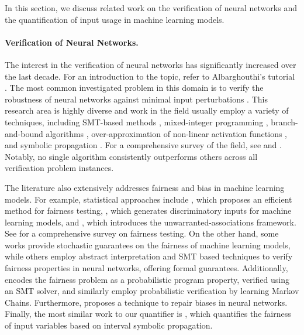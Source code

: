 In this section, we discuss related work on the verification of neural networks and the quantification of input usage in machine learning models.

\paragraph{Verification of Neural Networks.}

The interest in the verification of neural networks has significantly increased over the last decade. For an introduction to the topic, refer to Albarghouthi's tutorial \cite{Albarghouthi2021}.
The most common investigated problem in this domain is to verify the robustness of neural networks against minimal input perturbations .
This research area is highly diverse and work in the field usually employ a variety of techniques, including SMT-based methods , mixed-integer programming , branch-and-bound algorithms , over-approximation of non-linear activation functions , and symbolic propagation .
For a comprehensive survey of the field, see  and .
Notably, no single algorithm consistently outperforms others across all verification problem instances.

The literature also extensively addresses fairness and bias in machine learning models.
For example, statistical approaches include , which proposes an efficient method for fairness testing, , which generates discriminatory inputs for machine learning models, and , which introduces the unwarranted-associations framework.
See  for a comprehensive survey on fairness testing.
On the other hand, some works  provide stochastic guarantees on the fairness of machine learning models, while others employ abstract interpretation  and SMT based techniques  to verify fairness properties in neural networks, offering formal guarantees.
Additionally,  encodes the fairness problem as a probabilistic program property, verified using an SMT solver, and  similarly employ probabilistic verification by learning Markov Chains.
Furthermore,  proposes a technique to repair biases in neural networks.
Finally, the most similar work to our quantifier \qlibraname{} is , which quantifies the fairness of input variables based on interval symbolic propagation.

